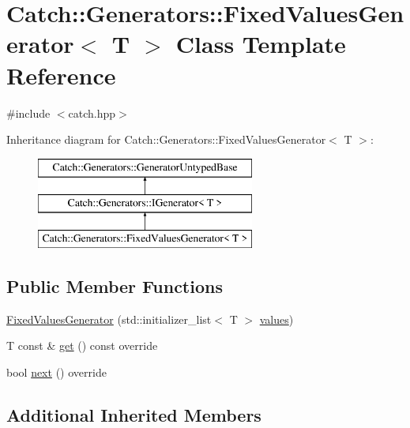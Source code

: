 \hypertarget{class_catch_1_1_generators_1_1_fixed_values_generator}{}\section{Catch\+:\+:Generators\+:\+:Fixed\+Values\+Generator$<$ T $>$ Class Template Reference}
\label{class_catch_1_1_generators_1_1_fixed_values_generator}


{\ttfamily \#include $<$catch.\+hpp$>$}

Inheritance diagram for Catch\+:\+:Generators\+:\+:Fixed\+Values\+Generator$<$ T $>$\+:\begin{figure}[H]
\begin{center}
\leavevmode
\includegraphics[height=3.000000cm]{class_catch_1_1_generators_1_1_fixed_values_generator}
\end{center}
\end{figure}
\subsection*{Public Member Functions}
\begin{DoxyCompactItemize}
\item 
\mbox{\hyperlink{class_catch_1_1_generators_1_1_fixed_values_generator_a6e9f473655413c1cb15f079890f06b86}{Fixed\+Values\+Generator}} (std\+::initializer\+\_\+list$<$ T $>$ \mbox{\hyperlink{namespace_catch_1_1_generators_a55ca9a1132e662d9603c516161dcae35}{values}})
\item 
T const  \& \mbox{\hyperlink{class_catch_1_1_generators_1_1_fixed_values_generator_ad2ea8c959c600386bcc4b2656b40d33e}{get}} () const override
\item 
bool \mbox{\hyperlink{class_catch_1_1_generators_1_1_fixed_values_generator_a6ce9e3ed045239c7b82873f24bd9cd3b}{next}} () override
\end{DoxyCompactItemize}
\subsection*{Additional Inherited Members}


